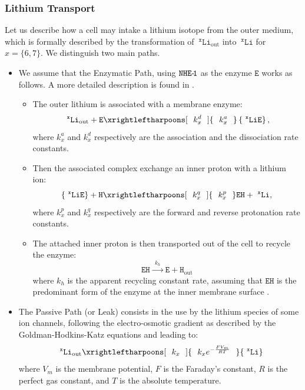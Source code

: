 \documentclass[aps,onecolumn,11pt]{revtex4}
\newcommand{\mychem}[1]{\mathtt{#1}}
\newcommand{\spLi}[1]{{~^{\mychem{#1}}\mychem{Li}}}
\newcommand{\spEout}{\mychem{E}}
\newcommand{\spLiE}[1]{\left\lbrace\spLi{#1}\spEout\right\rbrace}
\newcommand{\spLiOut}[1]{{\spLi{#1}}_{\mathrm{out}}}
\newcommand{\spEHin}{\mychem{EH}}
\newcommand{\spproton}{\mychem{H}}
\newcommand{\NHE}[1]{\mychem{NHE}{\mychem{\hbox{-}\!#1}}}
\newcommand{\todo}[1]{\framebox{\textbf{\color{WildStrawberry}{#1}}}}
\begin{document}
\subsubsection{Lithium Transport}

Let us describe how a cell may intake a lithium isotope from the outer medium, which is formally described by the transformation
of $\spLiOut{x}$ into $\spLi{x}$ for $x=\lbrace 6,7 \rbrace$. We distinguish two main paths.

\begin{itemize}
\item We assume that the Enzymatic Path, using $\NHE{1}$ as the enzyme $\spEout$ works as follows. A more detailed description is found in \todo{ref}.
	\begin{itemize}
	\item The outer lithium is associated with a membrane enzyme:
	\begin{equation}
		\label{eq:pre}
		\spLiOut{x} + \spEout  \xrightleftharpoons[~~k^d_x~~]{~~k^a_x~~} \spLiE{x},
	\end{equation}
	where $k^a_x$ and $k^d_x$ respectively are the association and the dissociation rate constants.
	
	\item Then the associated complex exchange an inner proton with a lithium ion:
	\begin{equation}
		\label{eq:xch}
		\spLiE{x} + \spproton   \xrightleftharpoons[~~k^q_x~~]{~~k^p_x~~}   \spEHin + \spLi{x}, 
	\end{equation}
	where $k^p_x$ and $k^q_x$ respectively are the forward and reverse protonation rate constants.
	
	\item The attached inner proton is then transported out of the cell to recycle the enzyme:
	\begin{equation}
			\spEHin   \xrightarrow{~~k_h~~}   \spEout + \spproton_{\mathrm{out}} 
	\end{equation}	
	where $k_h$ is the  apparent recycling constant rate, assuming that $\spEHin$ is the predominant form of the enzyme at the inner membrane surface \todo{Lacroix EMBO 2004 fig 3A}.
	\end{itemize}

\item The Passive Path (or Leak) consists in the use by the lithium species of some ion channels, following the electro-osmotic gradient as described by the Goldman-Hodkins-Katz \todo{ref} equations and leading to:
	\begin{equation}
	\label{eq:ghk}
		\spLiOut{x} \xrightleftharpoons[~~k_x~~]{~~k_x e^{-\frac{FV_m}{RT}}~~}   \spLi{x} 
	\end{equation}
where $V_m$ is the membrane potential, $F$ is the Faraday's constant, $R$ is the perfect gas constant, and $T$ is the absolute temperature.

\end{itemize}
\end{document}
